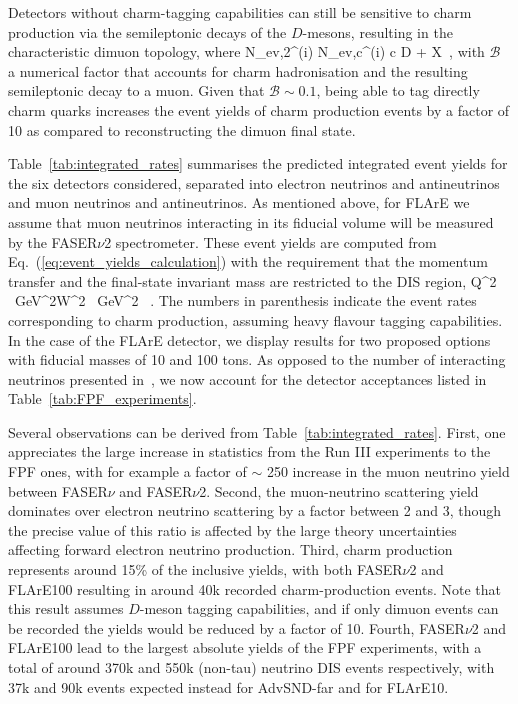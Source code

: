   Detectors without charm-tagging capabilities can still be sensitive to charm production via
  the semileptonic decays of the $D$-mesons, resulting in the characteristic
  dimuon topology, where
  \be
 N_{\rm ev,2\mu}^{(i)} \approx N_{\rm ev,c}^{(i)} \times {}\lp c \to D \to \mu + X\rp \, ,
 \ee
 with $\mathcal{B}$ a numerical factor that accounts for charm hadronisation and the
 resulting semileptonic decay to a muon.
 Given that $\mathcal{B}\sim 0.1$, being able to tag directly charm quarks increases the event yields
 of charm production events by a factor of 10 as compared to reconstructing the dimuon final state.

 Table~\ref{tab:integrated_rates} summarises the predicted integrated event yields for the six
 detectors
considered, separated into electron neutrinos and antineutrinos
and muon neutrinos and antineutrinos.
%
As mentioned above, for FLArE we assume that muon neutrinos interacting
in its fiducial volume will be measured
by the FASER$\nu$2 spectrometer.
These event yields are computed from Eq.~(\ref{eq:event_yields_calculation}) with the
requirement that the momentum transfer and the final-state invariant mass are restricted
to the DIS region,
\be
\label{eq:DISconditions}
Q^2 ~{\rm GeV}^2\quad  W^2 ~{\rm GeV}^2 \, .
\ee
%
The numbers in parenthesis indicate the event rates corresponding to charm
production, assuming heavy flavour tagging capabilities.
%
In the case of the FLArE detector, we display results for two proposed options with fiducial
masses of 10 and 100 tons.
%
As opposed to the number of interacting neutrinos presented
in~\cite{Feng:2022inv}, we now account for the
detector acceptances listed in  Table~\ref{tab:FPF_experiments}. 



Several observations can be derived from Table~\ref{tab:integrated_rates}.
%
First, one appreciates the large increase in statistics from
the Run III experiments to the FPF ones, with for example a factor of
$\sim$ 250 increase in the muon neutrino yield between FASER$\nu$ and
FASER$\nu$2.
%
Second, the muon-neutrino scattering yield dominates over electron neutrino scattering by a factor
between 2 and 3, though the precise value of this ratio is affected by the large theory uncertainties
affecting forward electron neutrino production.
%
Third, charm production  represents around 15\% of the inclusive
yields, with both FASER$\nu$2 and FLArE100 resulting in around
40k recorded charm-production events.
%
Note that this result assumes $D$-meson tagging capabilities,
and if only dimuon events can be recorded
the yields would be reduced by a factor of 10.
%
Fourth, FASER$\nu$2 and FLArE100 lead to the largest absolute
yields of the FPF experiments, with a total of around 370k and 550k (non-tau) neutrino DIS events respectively, with 37k and 90k
events expected instead for AdvSND-far and for FLArE10.


